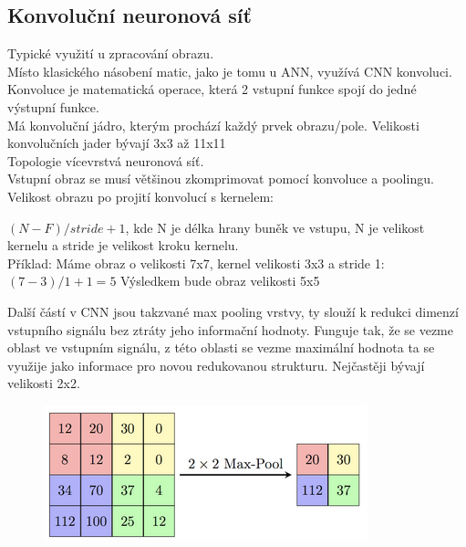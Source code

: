 \subsection{Konvoluční neuronová síť}
Typické využití u zpracování obrazu.\\
Místo klasického násobení matic, jako je tomu u ANN, využívá CNN konvoluci.\\
Konvoluce je matematická operace, která 2 vstupní funkce spojí do jedné výstupní funkce.\\
Má konvoluční jádro, kterým prochází každý prvek obrazu/pole. Velikosti konvolučních jader bývají 3x3 až 11x11\\
Topologie vícevrstvá neuronová síť.\\
Vstupní obraz se musí většinou zkomprimovat pomocí konvoluce a poolingu.\\
Velikost obrazu po projití konvolucí s kernelem:
\begin{center}
    \((N-F)/stride +1\), kde N je délka hrany buněk ve vstupu, N je velikost kernelu a stride je velikost kroku kernelu.\\
    Příklad: Máme obraz o velikosti 7x7, kernel velikosti 3x3 a stride 1:\\
    \((7-3)/1+1 = 5\) Výsledkem bude obraz velikosti 5x5
\end{center}
Další částí v CNN jsou takzvané max pooling vrstvy, ty slouží k redukci dimenzí vstupního signálu bez ztráty jeho informační hodnoty. Funguje tak, že se vezme oblast ve vstupním signálu, z této oblasti se vezme maximální hodnota ta se využije jako informace pro novou redukovanou strukturu. Nejčastěji bývají velikosti 2x2.\\
\begin{figure}[h!]
    \centering
    \includegraphics[scale = 0.5]{images/MaxPooling.png}
\end{figure}

